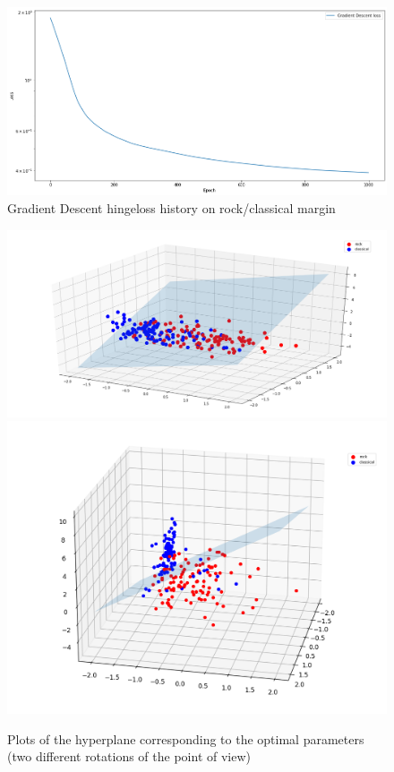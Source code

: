 \documentclass[12pt]{article}
\begin{document}
	\begin{figure}[H]
		\hspace{25pt}\includegraphics[scale=0.44]{gd1}
		\caption{Gradient Descent hingeloss history on rock/classical margin}
	\end{figure}
	\begin{figure}[H]
		\includegraphics[scale=0.4]{plane1}
		\includegraphics[scale=0.4]{plane1_side}
		\caption{Plots of the hyperplane corresponding to the optimal parameters (two different rotations of the point of view)}
	\end{figure}
\end{document}
